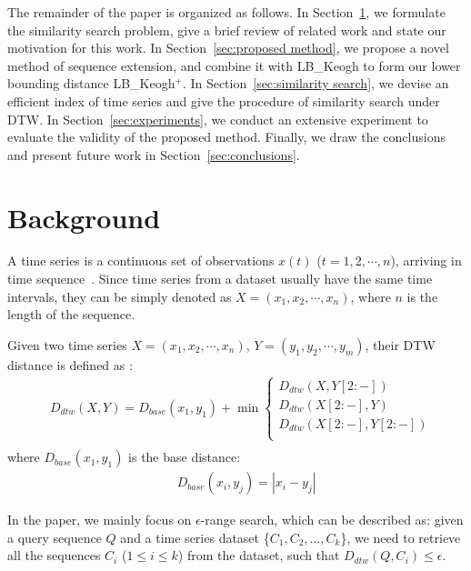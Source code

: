 \documentclass[10pt,journal,compsoc]{IEEEtran}
\begin{document}
The remainder of the paper is organized as follows.
In Section~\ref{sec:background}, we formulate the similarity search problem,
give a brief review of related work and state our motivation for this work.
In Section~\ref{sec:proposed method}, we propose a novel method of sequence extension,
and combine it with LB\_Keogh to form our lower bounding distance LB\_Keogh$^+$.
In Section~\ref{sec:similarity search}, we devise an efficient index of time series
and give the procedure of similarity search under DTW.
In Section~\ref{sec:experiments}, we conduct an extensive experiment to evaluate the validity of the proposed method.
Finally, we draw the conclusions and present future work in Section~\ref{sec:conclusions}.


\section{Background}\label{sec:background}

A time series is a continuous set of observations $x(t)$ ($t=1,2,\cdots ,n$),
arriving in time sequence~\cite{gorecki2018classification}.
Since time series from a dataset usually have the same time intervals,
they can be simply denoted as $X=(x_1,x_2,\cdots,x_n)$,
where $n$ is the length of the sequence.

Given two time series $X=(x_1,x_2,\cdots,x_n)$, $Y=(y_1,y_2,\cdots,y_m)$,
their DTW distance is defined as \cite{berndt1994using}:
\begin{equation}\label{eq:dtw definition}
\begin{split}
    & D_{dtw}(X,Y)= D_{base} (x_1 ,y_1 )+ \min \left\{ {\begin{array}{l}
 D_{dtw}(X,Y[2:-]) \\
 D_{dtw}(X[2:-],Y) \\
 D_{dtw}(X[2:-],Y[2:-]) \\
 \end{array}} \right.  \\
\end{split}
\end{equation}
where $D_{base}(x_1,y_1)$  is the base distance:
\begin{eqnarray}
&& D_{base}(x_i,y_j)=\left| {x_{i}-y_{j} } \right|
\end{eqnarray}

In the paper, we mainly focus on $\epsilon$-range search, which can be described as:
given a query sequence $Q$ and a time series dataset \{$C_1,C_2,\dots,C_k$\},
we need to retrieve all the sequences $C_i$ ($1 \leq i \leq k$) from the dataset,
such that $D_{dtw} (Q,C_i) \leq \epsilon$.
\end{document}
